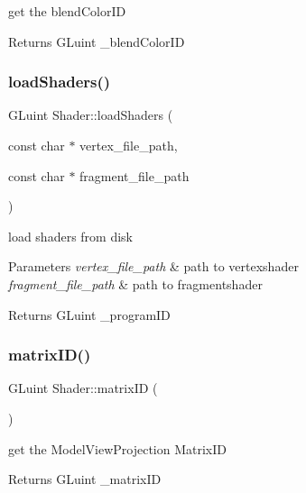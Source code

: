 get the blend\+Color\+ID 

\begin{DoxyReturn}{Returns}
G\+Luint \+\_\+blend\+Color\+ID 
\end{DoxyReturn}
\mbox{\label{class_shader_a7bc0245aea0f7c61d17a17273c2faaaf}} 
\subsubsection{\texorpdfstring{load\+Shaders()}{loadShaders()}}
{\footnotesize\ttfamily G\+Luint Shader\+::load\+Shaders (\begin{DoxyParamCaption}\item[{const char $\ast$}]{vertex\+\_\+file\+\_\+path,  }\item[{const char $\ast$}]{fragment\+\_\+file\+\_\+path }\end{DoxyParamCaption})}



load shaders from disk 


\begin{DoxyParams}{Parameters}
{\em vertex\+\_\+file\+\_\+path} & path to vertexshader \\
\hline
{\em fragment\+\_\+file\+\_\+path} & path to fragmentshader \\
\hline
\end{DoxyParams}
\begin{DoxyReturn}{Returns}
G\+Luint \+\_\+program\+ID 
\end{DoxyReturn}
\mbox{\label{class_shader_ac9bb10cba974bc2fb4ba78758591967f}} 
\subsubsection{\texorpdfstring{matrix\+I\+D()}{matrixID()}}
{\footnotesize\ttfamily G\+Luint Shader\+::matrix\+ID (\begin{DoxyParamCaption}{ }\end{DoxyParamCaption})\hspace{0.3cm}{\ttfamily [inline]}}



get the Model\+View\+Projection Matrix\+ID 

\begin{DoxyReturn}{Returns}
G\+Luint \+\_\+matrix\+ID 
\end{DoxyReturn}
\mbox{\label{class_shader_a64691ffa0d0d8b5ecdc4d06e698422bd}} 
